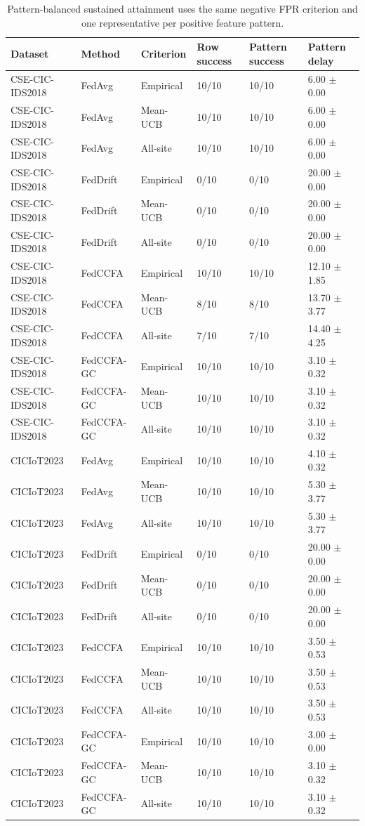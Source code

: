\begin{table}[t]
\centering
\small
\setlength{\tabcolsep}{3pt}
\caption{Pattern-balanced sustained attainment uses the same negative FPR criterion and one representative per positive feature pattern.}
\label{tab:pattern_balanced}
\begin{tabular}{llllll}
\hline
Dataset & Method & Criterion & Row success & Pattern success & Pattern delay \\
\hline
CSE-CIC-IDS2018 & FedAvg & Empirical & 10/10 & 10/10 & 6.00 $\pm$ 0.00 \\
CSE-CIC-IDS2018 & FedAvg & Mean-UCB & 10/10 & 10/10 & 6.00 $\pm$ 0.00 \\
CSE-CIC-IDS2018 & FedAvg & All-site & 10/10 & 10/10 & 6.00 $\pm$ 0.00 \\
CSE-CIC-IDS2018 & FedDrift & Empirical & 0/10 & 0/10 & 20.00 $\pm$ 0.00 \\
CSE-CIC-IDS2018 & FedDrift & Mean-UCB & 0/10 & 0/10 & 20.00 $\pm$ 0.00 \\
CSE-CIC-IDS2018 & FedDrift & All-site & 0/10 & 0/10 & 20.00 $\pm$ 0.00 \\
CSE-CIC-IDS2018 & FedCCFA & Empirical & 10/10 & 10/10 & 12.10 $\pm$ 1.85 \\
CSE-CIC-IDS2018 & FedCCFA & Mean-UCB & 8/10 & 8/10 & 13.70 $\pm$ 3.77 \\
CSE-CIC-IDS2018 & FedCCFA & All-site & 7/10 & 7/10 & 14.40 $\pm$ 4.25 \\
CSE-CIC-IDS2018 & FedCCFA-GC & Empirical & 10/10 & 10/10 & 3.10 $\pm$ 0.32 \\
CSE-CIC-IDS2018 & FedCCFA-GC & Mean-UCB & 10/10 & 10/10 & 3.10 $\pm$ 0.32 \\
CSE-CIC-IDS2018 & FedCCFA-GC & All-site & 10/10 & 10/10 & 3.10 $\pm$ 0.32 \\
CICIoT2023 & FedAvg & Empirical & 10/10 & 10/10 & 4.10 $\pm$ 0.32 \\
CICIoT2023 & FedAvg & Mean-UCB & 10/10 & 10/10 & 5.30 $\pm$ 3.77 \\
CICIoT2023 & FedAvg & All-site & 10/10 & 10/10 & 5.30 $\pm$ 3.77 \\
CICIoT2023 & FedDrift & Empirical & 0/10 & 0/10 & 20.00 $\pm$ 0.00 \\
CICIoT2023 & FedDrift & Mean-UCB & 0/10 & 0/10 & 20.00 $\pm$ 0.00 \\
CICIoT2023 & FedDrift & All-site & 0/10 & 0/10 & 20.00 $\pm$ 0.00 \\
CICIoT2023 & FedCCFA & Empirical & 10/10 & 10/10 & 3.50 $\pm$ 0.53 \\
CICIoT2023 & FedCCFA & Mean-UCB & 10/10 & 10/10 & 3.50 $\pm$ 0.53 \\
CICIoT2023 & FedCCFA & All-site & 10/10 & 10/10 & 3.50 $\pm$ 0.53 \\
CICIoT2023 & FedCCFA-GC & Empirical & 10/10 & 10/10 & 3.00 $\pm$ 0.00 \\
CICIoT2023 & FedCCFA-GC & Mean-UCB & 10/10 & 10/10 & 3.10 $\pm$ 0.32 \\
CICIoT2023 & FedCCFA-GC & All-site & 10/10 & 10/10 & 3.10 $\pm$ 0.32 \\
\hline
\end{tabular}
\end{table}
